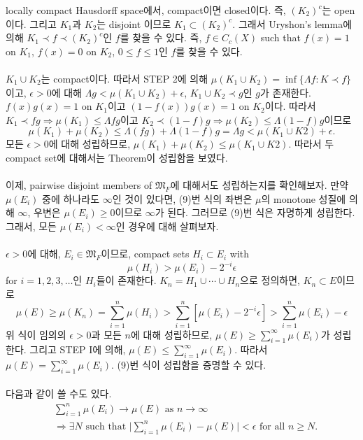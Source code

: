 \documentclass[11pt,reqno]{amsart}
\renewcommand{\(}{\left(}
\renewcommand{\)}{\right)}
\renewcommand{\[}{\left[}
\renewcommand{\]}{\right]}
\newcommand{\ep}{\epsilon}
\newcommand{\M}{\mathfrak{M}}
\begin{document}
locally compact Hausdorff space에서, compact이면 closed이다. 즉, $(K_2)^c$는 open이다. 그리고 
$K_1$과 $K_2$는 disjoint 이므로 $K_1 \subset (K_2)^c$. 그래서 Uryshon's lemma에 의해 
$K_1 \prec f \prec (K_2)^c$인 $f$를 찾을 수 있다. 즉, $f \in C_c(X)$ such that $f(x) = 1$ on 
$K_1$, $f(x) = 0$ on $K_2$, $0 \le f \le 1$인 $f$를 찾을 수 있다. \\ \\
$K_1 \cup K_2$는 compact이다. 따라서 STEP 2에 의해 $\mu(K_1 \cup K_2) = \inf \{ \Lambda f : K \prec f \}$
이고, $\ep > 0$에 대해 $\Lambda g < \mu(K_1 \cup K_2) + \ep$, $K_1 \cup K_2 \prec g$인 $g$가 존재한다. 
$f(x)g(x) = 1$ on $K_1$이고 $(1-f(x))g(x) = 1$ on $K_2$이다. 따라서 $K_1 \prec fg \Rightarrow \mu(K_1) \le 
\Lambda fg$이고 $K_2 \prec (1-f)g \Rightarrow \mu(K_2) \le \Lambda (1-f)g$이므로
\begin{equation*}
  \mu(K_1) + \mu(K_2) \le \Lambda(fg) + \Lambda(1-f)g = \Lambda g < \mu(K_1 \cup K2) + \ep.
\end{equation*}
모든 $\ep>0$에 대해 성립하므로, $\mu(K_1) + \mu(K_2) \le \mu(K_1 \cup K2)$. 따라서 두 compact set에 대해서는 
Theorem이 성립함을 보였다. \\ \\
이제, pairwise disjoint members of $\M_F$에 대해서도 성립하는지를 확인해보자. 만약 $\mu(E_i)$ 중에 하나라도 
$\infty$인 것이 있다면, (9)번 식의 좌변은 $\mu$의 monotone 성질에 의해 $\infty$, 우변은 $\mu(E_i) \ge 0$이므로 
$\infty$가 된다. 그러므로 (9)번 식은 자명하게 성립한다. 그래서, 모든 $\mu(E_i) < \infty$인 경우에 대해 살펴보자. \\ \\
$\ep > 0$에 대해, $E_i \in \M_F$이므로, compact sets $H_i \subset E_i$ with
\begin{equation}
  \mu (H_i) > \mu (E_i) - 2 ^{-i} \ep
\end{equation} for $i = 1, 2, 3, \dots$인 $H_i$들이 존재한다. $K_n = H_1 \cup \cdots \cup H_n$으로 정의하면, 
$K_n \subset E$이므로
\begin{equation}
  \mu (E) \ge \mu (K_n) = \sum_{i=1}^n \mu (H_i) > \sum_{i=1}^n \[ \mu (E_i) - 2 ^{-i} \ep \] > \sum_{i=1}^n \mu (E_i) - \ep
\end{equation}
위 식이 임의의 $\ep>0$과 모든 $n$에 대해 성립하므로, $\mu(E) \ge \sum_{i=1}^\infty \mu (E_i)$가 성립한다. 
그리고 STEP I에 의해, $\mu(E) \le \sum_{i=1}^\infty \mu (E_i)$. 따라서 $\mu(E) = \sum_{i=1}^\infty \mu (E_i)$. 
(9)번 식이 성립함을 증명할 수 있다. \\ \\
다음과 같이 쓸 수도 있다. \begin{align*}
  & \sum_{i=1}^n \mu(E_i) \to \mu(E) \text{ as } n \to \infty \\
  & \Rightarrow \exists N \text{ such that } \big| \sum_{i=1}^n \mu(E_i) - \mu(E) \big| < \ep \text{ for all }n \ge N.
\end{align*}
\end{document}
